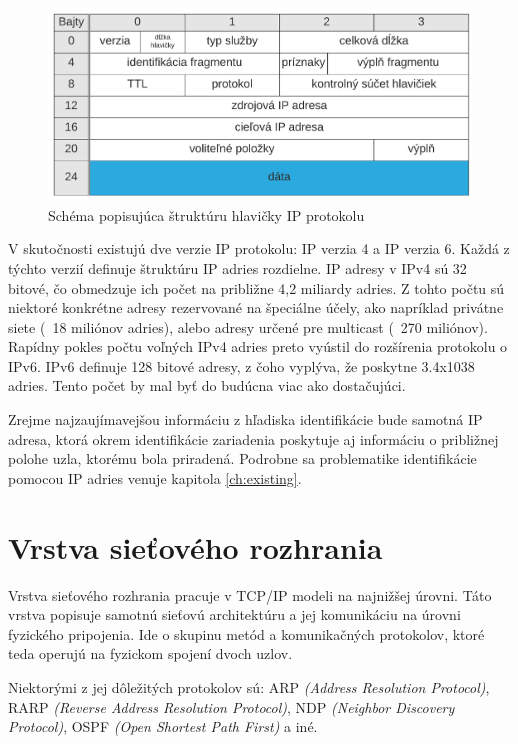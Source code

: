 \documentclass[
  digital, %
  table,   %
  lof,     %
  nolot,   %
  nocover
]{fithesis3}
\begin{document}
\begin{figure}[h]
  \centering
    \includegraphics[width=.95\textwidth]{images/net-ip-head.png}
  \caption{Schéma popisujúca štruktúru hlavičky IP protokolu}
  \label{fig:net-ip-head}
\end{figure}

V skutočnosti existujú dve verzie IP protokolu: IP verzia 4 a IP verzia 6.
Každá z týchto verzií definuje štruktúru IP adries rozdielne. IP adresy v IPv4
sú 32 bitové, čo obmedzuje ich počet na približne 4,2 miliardy adries. Z tohto
počtu sú niektoré konkrétne adresy rezervované na špeciálne účely, ako napríklad
privátne siete (~18 miliónov adries), alebo adresy určené pre multicast
(~270 miliónov). Rapídny pokles počtu voľných IPv4 adries preto vyústil do
rozšírenia protokolu o IPv6. IPv6 definuje 128 bitové adresy, z čoho vyplýva,
že poskytne 3.4x1038 adries. Tento počet by mal byť do budúcna viac ako
dostačujúci.

Zrejme najzaujímavejšou informáciu z hľadiska identifikácie bude samotná IP
adresa, ktorá okrem identifikácie zariadenia poskytuje aj informáciu o
približnej polohe uzla, ktorému bola priradená. Podrobne sa problematike
identifikácie pomocou IP adries venuje kapitola \ref{ch:existing}. 

\section{Vrstva sieťového rozhrania}
Vrstva sieťového rozhrania pracuje v TCP/IP modeli na najnižšej úrovni.
Táto vrstva popisuje samotnú sieťovú architektúru a jej komunikáciu na úrovni
fyzického pripojenia. Ide o skupinu metód a komunikačných protokolov, ktoré 
teda operujú na fyzickom spojení dvoch uzlov.

Niektorými z jej dôležitých protokolov sú: ARP
\textit{(Address Resolution Protocol)}, RARP
\textit{(Reverse Address Resolution Protocol)},
NDP \textit{(Neighbor Discovery Protocol)}, OSPF
\textit{(Open Shortest Path First)} a iné.
\end{document}

